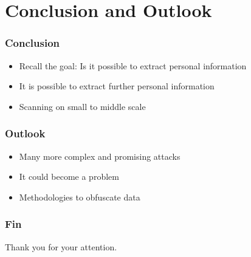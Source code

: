 \documentclass[t]{beamer}
\begin{document}
\section{Conclusion and Outlook}
\begin{frame}
    \frametitle{Conclusion}
    \vspace{1cm}
    \begin{itemize}
        \item Recall the goal: Is it possible to extract personal information
        \pause{}
        \item It is possible to extract further personal information
        \pause{}
        \item Scanning on small to middle scale
    \end{itemize}
\end{frame}

\begin{frame}
    \frametitle{Outlook}
    \vspace{1cm}
    \begin{itemize}
        \item Many more complex and promising attacks
        \pause{}
        \item It could become a problem
        \pause{}
        \item Methodologies to obfuscate data
    \end{itemize}
\end{frame}


\begin{frame}
    \frametitle{Fin}
    Thank you for your attention.
\end{frame}
\end{document}
